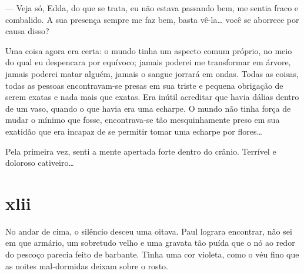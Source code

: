 
--- Veja só, Edda, do que se trata, eu não estava passando bem, me sentia
    fraco e combalido. A sua presença sempre me faz bem, basta vê-la\ldots
    {} você se aborrece por causa disso?


Uma coisa agora era certa: o mundo tinha um aspecto comum próprio, no meio do
qual eu despencara por equívoco; jamais poderei me transformar em árvore,
jamais poderei matar alguém, jamais o sangue jorrará em ondas. Todas as
coisas, todas as pessoas encontravam-se presas em sua triste e pequena
obrigação de serem exatas e nada mais que exatas. Era inútil acreditar que
havia dálias dentro de um vaso, quando o que havia era uma echarpe. O mundo
não tinha força de mudar o mínimo que fosse, encontrava-se tão mesquinhamente
preso em sua exatidão que era incapaz de se permitir tomar uma echarpe por
flores\ldots{}

Pela primeira vez, senti a mente apertada forte dentro do crânio. Terrível e
doloroso cativeiro\ldots{}


\section{xlii} 

 

No andar de cima, o silêncio desceu uma oitava. Paul lograra encontrar, não
sei em que armário, um sobretudo velho e uma gravata tão puída que o nó ao
redor do pescoço parecia feito de barbante. Tinha uma cor violeta, como o véu
fino que as noites mal-dormidas deixam sobre o rosto.

